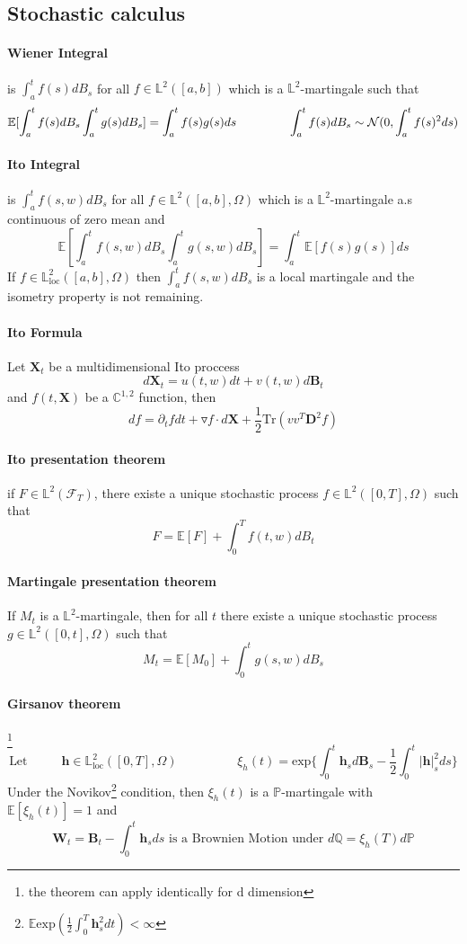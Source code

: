 \documentclass[a4paper,10pt]{article}
\begin{document}
\subsection{Stochastic calculus}
\paragraph{Wiener Integral} is $\int_a^t f(s)dB_s$ for all $f\in \mathbb{L}^2([a,b])$ which is a $\mathbb{L}^2$-martingale such that
\[
\mathbb{E}[\int_a^t f(s)dB_s \int_a^t g(s)dB_s] = \int_a^t f(s)g(s)ds
\hspace{1.5cm}
\int_a^t f(s)dB_s \sim \mathcal{N}(0, \int_a^t f(s)^2ds)
\]
\paragraph{Ito Integral} is $\int_a^t f(s,w)dB_s$ for all $f\in \mathbb{L}^2([a,b],\Omega)$ which is a $\mathbb{L}^2$-martingale a.s continuous of zero mean and
\[
\mathbb{E}[\int_a^t f(s,w)dB_s \int_a^t g(s,w)dB_s] = \int_a^t \mathbb{E}[f(s)g(s)]ds
\]
If $f\in \mathbb{L}_{\text{loc}}^2([a,b],\Omega)$ then $\int_a^t f(s,w)dB_s$ is a local martingale and the isometry property is not remaining.
\paragraph{Ito Formula}
Let $\textbf{X}_t$ be a multidimensional Ito proccess
\[
d\textbf{X}_t = u(t,w)dt + v(t,w)d\textbf{B}_t
\]
and $f(t,\textbf{X})$ be a $\mathbb{C}^{1,2}$ function, then
\[
df = \partial_t f dt + \triangledown f \cdot d\textbf{X} + \frac{1}{2} \text{Tr}(vv^T \textbf{D}^2f  )
\]
\paragraph{Ito presentation theorem}
if $F \in \mathbb{L}^2(\mathcal{F}_T)$, there existe a unique stochastic process $f\in \mathbb{L}^2([0,T],\Omega)$ such that
\[
F = \mathbb{E}[F] + \int_0^T f(t,w)dB_t
\]
\paragraph{Martingale presentation theorem}
If $M_t$ is a $\mathbb{L}^2$-martingale, then for all $t$ there existe a unique stochastic process $g\in \mathbb{L}^2([0,t],\Omega)$ such that
\[
M_t = \mathbb{E}[M_0] + \int_0^t g(s,w)dB_s
\]
\paragraph{Girsanov theorem}\footnote{the theorem can apply identically for d dimension}
\[
\text{Let }\hspace{1cm}
\textbf{h}\in \mathbb{L}_{\text{loc}}^2([0,T],\Omega)
\hspace{2cm}
\xi_h(t) = \text{exp}\{ \int_0^t \textbf{h}_s d\textbf{B}_s - \frac{1}{2} \int_0^t |\textbf{h}|_s^2 ds \}
\]
Under the Novikov\footnote{$\mathbb{E}\text{exp}(\frac{1}{2}\int_0^T \textbf{h}^2_sdt) < \infty $} condition, then $\xi_h(t)$ is a $\mathbb{P}$-martingale with $\mathbb{E}[\xi_h(t)]=1$ and
\[
\textbf{W}_t = \textbf{B}_t - \int_0^t \textbf{h}_sds \text{ is a Brownien Motion under }d\mathbb{Q} =\xi_h(T) d\mathbb{P}
\]
\end{document}
